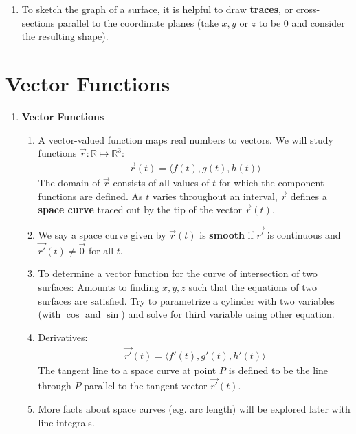 \documentclass[10pt]{article}
\begin{document}
\begin{multicols}{2}
\begin{enumerate}
\begin{enumerate}
    \item To sketch the graph of a surface, it is helpful to draw \textbf{traces}, or cross-sections parallel to the coordinate planes (take $x,y$ or $z$ to be 0 and consider the resulting shape).
\end{enumerate}
\end{enumerate}
\section{Vector Functions}
\begin{enumerate}
    \item \textbf{Vector Functions}
    \begin{enumerate}
        \item A vector-valued function maps real numbers to vectors. We will study functions $\vec{r}: \mathbb{R} \mapsto \mathbb{R}^3$:
        \begin{align*}
            \vec{r}(t) = \langle f(t), g(t), h(t) \rangle
        \end{align*}
        The domain of $\vec{r}$ consists of all values of $t$ for which the component functions are defined. As $t$ varies throughout an interval, $\vec{r}$ defines a \textbf{space curve} traced out by the tip of the vector $\vec{r}(t)$. 
        
        \item We say a space curve given by $\vec{r}(t)$ is \textbf{smooth} if $\vec{r'}$ is continuous and $\vec{r'}(t) \neq \vec{0}$ for all $t$.
        
        \item To determine a vector function for the curve of intersection of two surfaces: Amounts to finding $x,y,z$ such that the equations of two surfaces are satisfied. Try to parametrize a cylinder with two variables (with $\cos$ and $\sin$) and solve for third variable using other equation.
        
        \item Derivatives:
        \begin{align*}
            \vec{r'}(t) = \langle f'(t), g'(t), h'(t) \rangle
        \end{align*}
        The tangent line to a space curve at point $P$ is defined to be the line through $P$ parallel to the tangent vector $\vec{r'}(t)$.
        
        \item More facts about space curves (e.g. arc length) will be explored later with line integrals. 
        

\end{enumerate}
\end{enumerate}
\end{multicols}
\end{document}
